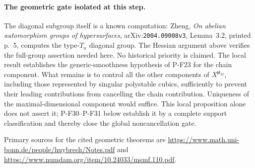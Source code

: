 \paragraph{The geometric gate isolated at this step.}
The diagonal subgroup itself is a known computation:
Zheng, \emph{On abelian automorphism groups of hypersurfaces},
arXiv:\texttt{2004.09008v3}, Lemma~3.2, printed p.~5,
computes the type-$T_n$ diagonal group. The Hessian argument
above verifies the full-group assertion needed here.
No historical priority is claimed. The local result establishes
the generic-smoothness hypothesis of P-F23 for the chain component.
What remains is to control all the other components of
$X^{\boldsymbol\mu_M}$, including those represented by
singular polystable cubics, sufficiently to prevent their
leading contributions from cancelling the chain contribution.
Uniqueness of the maximal-dimensional component would suffice.
This local proposition alone does not assert it; P-F30--P-F31
below establish it by a complete support classification and
thereby close the global noncancellation gate.

Primary sources for the cited geometric theorems are
\url{https://www.math.uni-bonn.de/people/huybrech/Notes.pdf}
and \url{https://www.numdam.org/item/10.24033/msmf.110.pdf}.
